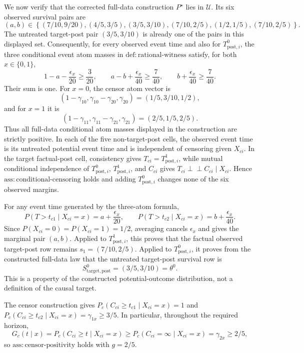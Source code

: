 We now verify that the corrected full-data construction \(P^\star\) lies in \(\mathcal U\). Its six observed survival pairs are
\[
(a,b)\in
\left\{(7/10,9/20),(4/5,3/5),(3/5,3/10),
(7/10,2/5),(1/2,1/5),(7/10,2/5)\right\}.
\]
The untreated target-post pair \((3/5,3/10)\) is already one of the pairs in this displayed set. Consequently, for every observed event time and also for \(T^{0}_{\mathrm{post},i}\), the three conditional event atom masses in \(\mathrm{def{:}rational\mbox{-}witness}\) satisfy, for both \(x\in\{0,1\}\),
\[
1-a-\frac{\epsilon_x}{20}\ge\frac3{20},\qquad
a-b+\frac{\epsilon_x}{40}\ge\frac7{40},\qquad
b+\frac{\epsilon_x}{40}\ge\frac7{40}.
\]
Their sum is one. For \(x=0\), the censor atom vector is
\[
(1-\gamma_{10},\gamma_{10}-\gamma_{20},\gamma_{20})
=(1/5,3/10,1/2),
\]
and for \(x=1\) it is
\[
(1-\gamma_{11},\gamma_{11}-\gamma_{21},\gamma_{21})
=(2/5,1/5,2/5).
\]
Thus all full-data conditional atom masses displayed in the construction are strictly positive. In each of the five non-target-post cells, the observed event time is its untreated potential event time and is independent of censoring given \(X_{ci}\). In the target factual-post cell, consistency gives \(T_{ci}=T^{1}_{\mathrm{post},i}\), while mutual conditional independence of \(T^{0}_{\mathrm{post},i}\), \(T^{1}_{\mathrm{post},i}\), and \(C_{ci}\) gives \(T_{ci}\mathbin{\perp\!\!\!\perp}C_{ci}\mid X_{ci}\). Hence \(\mathrm{ass{:}conditional\mbox{-}censoring}\) holds and adding \(T^{0}_{\mathrm{post},i}\) changes none of the six observed margins.

For any event time generated by the three-atom formula,
\[
P(T>t_{c1}\mid X_{ci}=x)=a+\frac{\epsilon_x}{20},
\qquad
P(T>t_{c2}\mid X_{ci}=x)=b+\frac{\epsilon_x}{40}.
\]
Since \(P(X_{ci}=0)=P(X_{ci}=1)=1/2\), averaging cancels \(\epsilon_x\) and gives the marginal pair \((a,b)\). Applied to \(T^{1}_{\mathrm{post},i}\), this proves that the factual observed target-post row remains \(s_1=(7/10,2/5)\). Applied to \(T^{0}_{\mathrm{post},i}\), it proves from the constructed full-data law that the untreated target-post survival row is
\[
S^0_{\mathrm{target,post}}=(3/5,3/10)=\theta^0.
\]
This is a property of the constructed potential-outcome distribution, not a definition of the causal target.

The censor construction gives \(P_c(C_{ci}\ge t_{c1}\mid X_{ci}=x)=1\) and \(P_c(C_{ci}\ge t_{c2}\mid X_{ci}=x)=\gamma_{1x}\ge3/5\). In particular, throughout the required horizon,
\[
G_c(t\mid x)=P_c(C_{ci}\ge t\mid X_{ci}=x)
\ge P_c(C_{ci}=\infty\mid X_{ci}=x)
=\gamma_{2x}\ge2/5,
\]
so \(\mathrm{ass{:}censor\mbox{-}positivity}\) holds with \(g=2/5\).

